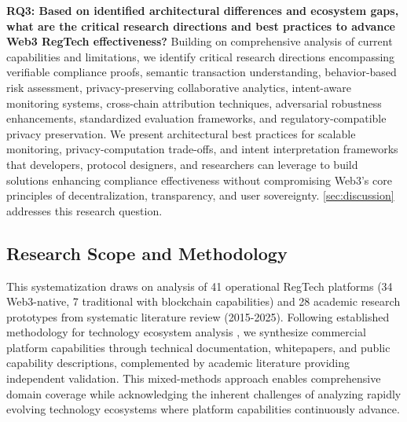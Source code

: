 \noindent\textbf{RQ3: Based on identified architectural differences and ecosystem gaps, what are the critical research directions and best practices to advance Web3 RegTech effectiveness?}
Building on comprehensive analysis of current capabilities and limitations, we identify critical research directions encompassing verifiable compliance proofs, semantic transaction understanding, behavior-based risk assessment, privacy-preserving collaborative analytics, intent-aware monitoring systems, cross-chain attribution techniques, adversarial robustness enhancements, standardized evaluation frameworks, and regulatory-compatible privacy preservation. We present architectural best practices for scalable monitoring, privacy-computation trade-offs, and intent interpretation frameworks that developers, protocol designers, and researchers can leverage to build solutions enhancing compliance effectiveness without compromising Web3's core principles of decentralization, transparency, and user sovereignty. \autoref{sec:discussion} addresses this research question.

\subsection{Research Scope and Methodology}
This systematization draws on analysis of 41 operational RegTech platforms (34 Web3-native, 7 traditional with blockchain capabilities) and 28 academic research prototypes from systematic literature review (2015-2025). Following established methodology for technology ecosystem analysis \cite{arner2016fintechregtechreconceptualization,bonneau2015sokresearchperspectives}, we synthesize commercial platform capabilities through technical documentation, whitepapers, and public capability descriptions, complemented by academic literature providing independent validation. This mixed-methods approach enables comprehensive domain coverage while acknowledging the inherent challenges of analyzing rapidly evolving technology ecosystems where platform capabilities continuously advance.



